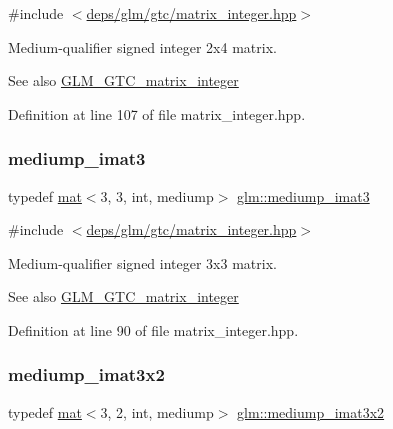 {\ttfamily \#include $<$\hyperlink{matrix__integer_8hpp}{deps/glm/gtc/matrix\+\_\+integer.\+hpp}$>$}

Medium-\/qualifier signed integer 2x4 matrix. \begin{DoxySeeAlso}{See also}
\hyperlink{group__gtc__matrix__integer}{G\+L\+M\+\_\+\+G\+T\+C\+\_\+matrix\+\_\+integer} 
\end{DoxySeeAlso}


Definition at line 107 of file matrix\+\_\+integer.\+hpp.

\mbox{\label{group__gtc__matrix__integer_gac6ab7a5cfe157ba8deb79a7691ad8263}} 
\subsubsection{\texorpdfstring{mediump\+\_\+imat3}{mediump\_imat3}}
{\footnotesize\ttfamily typedef \hyperlink{structglm_1_1mat}{mat}$<$3, 3, int, mediump$>$ \hyperlink{group__gtc__matrix__integer_gac6ab7a5cfe157ba8deb79a7691ad8263}{glm\+::mediump\+\_\+imat3}}



{\ttfamily \#include $<$\hyperlink{matrix__integer_8hpp}{deps/glm/gtc/matrix\+\_\+integer.\+hpp}$>$}

Medium-\/qualifier signed integer 3x3 matrix. \begin{DoxySeeAlso}{See also}
\hyperlink{group__gtc__matrix__integer}{G\+L\+M\+\_\+\+G\+T\+C\+\_\+matrix\+\_\+integer} 
\end{DoxySeeAlso}


Definition at line 90 of file matrix\+\_\+integer.\+hpp.

\mbox{\label{group__gtc__matrix__integer_gae3f0a14fb81eb2edc0caf5b131adb969}} 
\subsubsection{\texorpdfstring{mediump\+\_\+imat3x2}{mediump\_imat3x2}}
{\footnotesize\ttfamily typedef \hyperlink{structglm_1_1mat}{mat}$<$3, 2, int, mediump$>$ \hyperlink{group__gtc__matrix__integer_gae3f0a14fb81eb2edc0caf5b131adb969}{glm\+::mediump\+\_\+imat3x2}}



